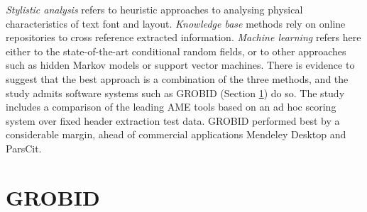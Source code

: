 \emph{Stylistic analysis} refers to heuristic approaches to analysing physical characteristics of text font and layout. \emph{Knowledge base} methods rely on online repositories to cross reference extracted information. \emph{Machine learning} refers here either to the state-of-the-art conditional random fields, or to other approaches such as hidden Markov models or support vector machines. There is evidence to suggest that the best approach is a combination of the three methods, and the study admits software systems such as GROBID (Section \ref{sec:grobid}) do so. The study includes a comparison of the leading AME tools based on an ad hoc scoring system over fixed header extraction test data. GROBID performed best by a considerable margin, ahead of commercial applications Mendeley Desktop and ParsCit.

\section{GROBID}
\label{sec:grobid}
